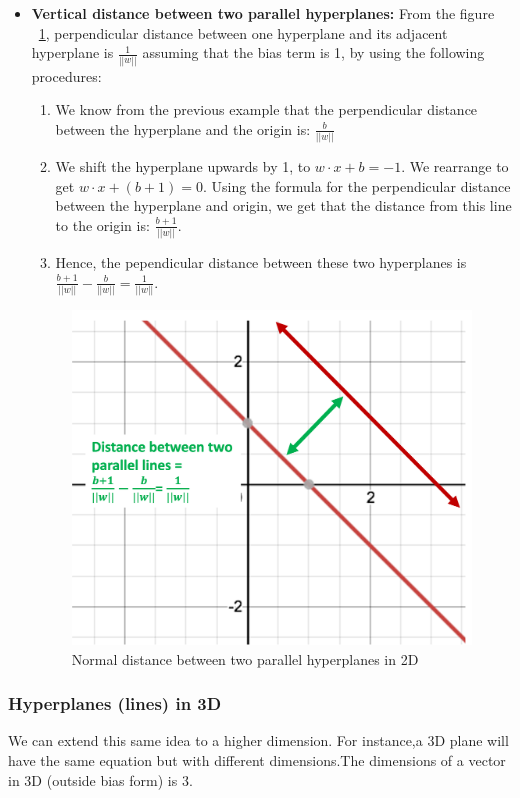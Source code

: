 \documentclass[11pt]{article}
\begin{document}
\begin{itemize}
\item{
\textbf{Vertical distance between two parallel hyperplanes:} From the figure ~\ref{fig:sfig4}, perpendicular distance between one hyperplane and its adjacent hyperplane is $\frac{1}{||w||}$ assuming that the bias term is 1,  by using the following procedures:
\begin{enumerate}
    \item We know from the previous example that the perpendicular distance between the hyperplane and the origin is: $\frac{b}{||w||}$
    \item We shift the hyperplane upwards by 1, to $w \cdot x + b = -1$. We rearrange to get $w \cdot x + (b+1)= 0$. Using the formula for the perpendicular distance between the hyperplane and origin, we get that the distance from this line to the origin is: $\frac{b+1}{||w||}$.
    \item Hence, the pependicular distance between these two hyperplanes is $\frac{b+1}{||w||} - \frac{b}{||w||} = \frac{1}{||w||}$.
\end{enumerate}

\begin{figure}[H]
  \centering
  \includegraphics[width=.4\linewidth]{images/distance_2_lines.png}
  \caption{Normal distance between two parallel hyperplanes in 2D}
  \label{fig:sfig4}
\end{figure}

}
\end{itemize}

\subsubsection{Hyperplanes (lines) in 3D}
We can extend this same idea to a higher dimension. For instance,a 3D plane will have the same equation but with different dimensions.The dimensions of a vector in 3D (outside bias form) is 3.
\end{document}
